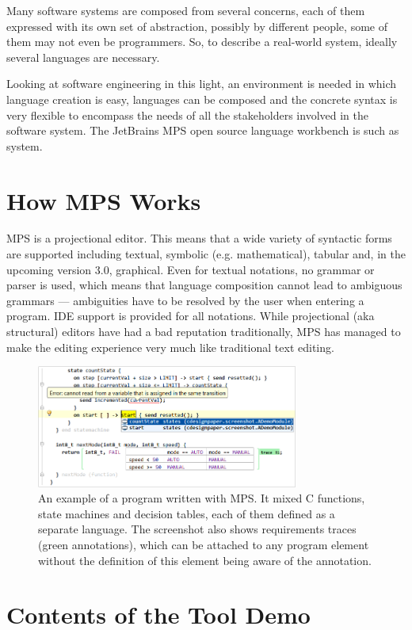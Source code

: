 \documentclass[10pt, conference, compsocconf]{IEEEtran}
\begin{document}
Many software systems are composed from several concerns, each of them expressed
with its own set of abstraction, possibly by different people, some of them may
not even be programmers. So, to describe a real-world system, ideally several
languages are necessary.

Looking at software engineering in this light, an environment is needed in
which language creation is easy, languages can be composed and the concrete
syntax is very flexible to encompass the needs of all the stakeholders involved
in the software system. The JetBrains MPS open source language workbench is such
as system.

\section{How MPS Works}

\noindent
MPS is a projectional editor. This means that a wide variety of syntactic forms
are supported including textual, symbolic (e.g. mathematical), tabular and, in
the upcoming version 3.0, graphical. Even for textual notations, no grammar or
parser is used, which means that language composition cannot lead to ambiguous
grammars --- ambiguities have to be resolved by the user when entering a
program. IDE support is provided for all notations. While projectional (aka
structural) editors have had a bad reputation traditionally, MPS has managed to
make the editing experience very much like traditional text editing.
 

\begin{figure}[h]  
\includegraphics[width=8.6cm]{figures/screenshot.png}
\caption{An example of a program written with MPS. It mixed C functions,
state machines and decision tables, each of them defined as a separate
language. The screenshot also shows requirements traces (green annotations),
which can be attached to any program element without the definition of this
element being aware of the annotation.}
\label{screenshot}
\end{figure}

\section{Contents of the Tool Demo}
\end{document}
